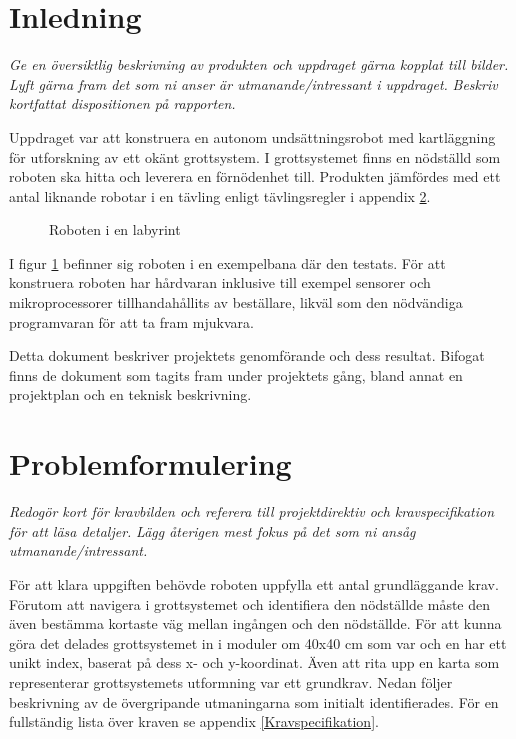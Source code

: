 \documentclass[11pt]{article}
\begin{document}
\begin{flushleft}
\section{Inledning}
\textit{Ge en översiktlig beskrivning av produkten och uppdraget gärna kopplat till bilder.}
\textit{Lyft gärna fram det som ni anser är utmanande/intressant i uppdraget.}
\textit{Beskriv kortfattat dispositionen på rapporten.}


Uppdraget var att konstruera en autonom undsättningsrobot med kartläggning för utforskning av ett okänt grottsystem. I grottsystemet finns en nödställd som roboten ska hitta och leverera en förnödenhet till. Produkten jämfördes med ett antal liknande robotar i en tävling enligt tävlingsregler i appendix \ref{}.

\begin{figure}[!htbp]
\centering
\noindent{}
	\caption{Roboten i en labyrint \label{scene}}	
\end{figure}

I figur \ref{scene} befinner sig roboten i en exempelbana där den testats. För att konstruera roboten har hårdvaran inklusive till exempel sensorer och mikroprocessorer tillhandahållits av beställare, likväl som den nödvändiga programvaran för att ta fram mjukvara.

Detta dokument beskriver projektets genomförande och dess resultat. Bifogat finns de dokument som tagits fram under projektets gång, bland annat en projektplan och en teknisk beskrivning.

\pagebreak

\section{Problemformulering}
\textit{Redogör kort för kravbilden och referera till projektdirektiv och kravspecifikation för att läsa detaljer.}
\textit{Lägg återigen mest fokus på det som ni ansåg utmanande/intressant.}

För att klara uppgiften behövde roboten uppfylla ett antal grundläggande krav. Förutom att navigera i grottsystemet och identifiera den nödställde måste den även bestämma kortaste väg mellan ingången och den nödställde. För att kunna göra det delades grottsystemet in i moduler om 40x40 cm som var och en har ett unikt index, baserat på dess x- och y-koordinat. Även att rita upp en karta som representerar grottsystemets utformning var ett grundkrav. Nedan följer beskrivning av de övergripande utmaningarna som initialt identifierades. För en fullständig lista över kraven se appendix \ref{Kravspecifikation}.


\end{flushleft}
\end{document}
